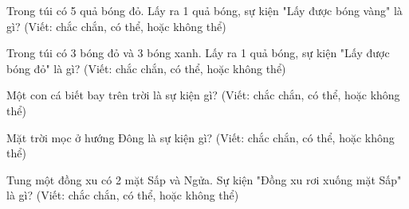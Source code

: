 \begin{ex} %
Trong túi có 5 quả bóng đỏ. Lấy ra 1 quả bóng, sự kiện "Lấy được bóng vàng" là gì? (Viết: chắc chắn, có thể, hoặc không thể)
\end{ex}

\begin{ex} %
Trong túi có 3 bóng đỏ và 3 bóng xanh. Lấy ra 1 quả bóng, sự kiện "Lấy được bóng đỏ" là gì? (Viết: chắc chắn, có thể, hoặc không thể)
\end{ex}

\begin{ex} %
Một con cá biết bay trên trời là sự kiện gì? (Viết: chắc chắn, có thể, hoặc không thể)
\end{ex}

\begin{ex} %
Mặt trời mọc ở hướng Đông là sự kiện gì? (Viết: chắc chắn, có thể, hoặc không thể)
\end{ex}

\begin{ex} %
Tung một đồng xu có 2 mặt Sấp và Ngửa. Sự kiện "Đồng xu rơi xuống mặt Sấp" là gì? (Viết: chắc chắn, có thể, hoặc không thể)
\end{ex}
